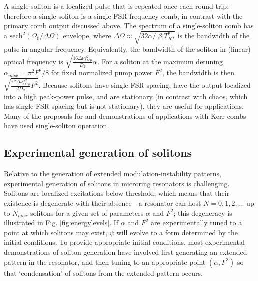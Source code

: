 {A single soliton is a localized pulse that is repeated once each round-trip; therefore a single soliton is a single-FSR frequency comb, in contrast with the primary comb output discussed above. The spectrum of a single-soliton comb has a $\mathrm{sech}^2(\Omega_0/\Delta \Omega)$ envelope, where $\Delta\Omega\approx\sqrt{32\alpha/|\beta| T_{RT}^2 }$ is the bandwidth of the pulse in angular frequency. Equivalently, the bandwidth of the soliton in (linear) optical frequency is $\sqrt{\frac{16\Delta\nu f_{rep}^2}{D_2}\alpha}$. For a soliton at the maximum detuning $\alpha_{max}=\pi^2F^2/8$ for fixed normalized pump power $F^2$, the bandwidth is then $\sqrt{\frac{\pi^2\Delta\nu f_{rep}^2}{2 D_2}F^2}$. Because solitons have single-FSR spacing, have the output localized into a high peak-power pulse, and are stationary (in contrast with chaos, which has single-FSR spacing but is not-stationary), they are useful for applications. Many of the proposals for and demonstrations of applications with Kerr-combs have used single-soliton operation. 

\subsection{Experimental generation of solitons}


Relative to the generation of extended modulation-instability patterns, experimental generation of solitons in microring resonators is challenging. Solitons are localized excitations below threshold, which means that their existence is degenerate with their absence---a resonator can host $N=0, 1, 2,...$ up to $N_{max}$ solitons for a given set of parameters $\alpha$ and $F^2$; this degeneracy is illustrated in Fig. \ref{fig:energylevels}. If $\alpha$ and $F^2$ are experimentally tuned to a point at which solitons may exist, $\psi$ will evolve to a form determined by the initial conditions. To provide appropriate initial conditions, most experimental demonstrations of soliton generation have involved first generating an extended pattern in the resonator, and then tuning to an appropriate point $(\alpha,F^2)$ so that `condensation' of solitons from the extended pattern occurs. 

}
